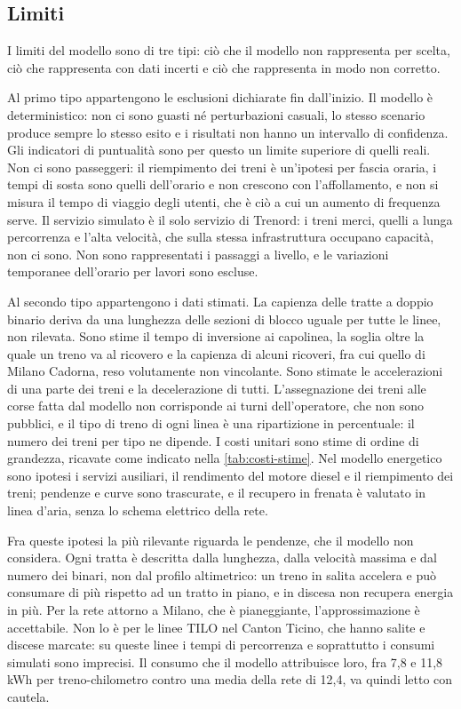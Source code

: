 \subsection{Limiti}
I limiti del modello sono di tre tipi: ciò che il modello non rappresenta per scelta, ciò che rappresenta con dati incerti e ciò che rappresenta in modo non corretto.

Al primo tipo appartengono le esclusioni dichiarate fin dall'inizio. Il modello è deterministico: non ci sono guasti né perturbazioni casuali, lo stesso scenario produce sempre lo stesso esito e i risultati non hanno un intervallo di confidenza. Gli indicatori di puntualità sono per questo un limite superiore di quelli reali. Non ci sono passeggeri: il riempimento dei treni è un'ipotesi per fascia oraria, i tempi di sosta sono quelli dell'orario e non crescono con l'affollamento, e non si misura il tempo di viaggio degli utenti, che è ciò a cui un aumento di frequenza serve. Il servizio simulato è il solo servizio di Trenord: i treni merci, quelli a lunga percorrenza e l'alta velocità, che sulla stessa infrastruttura occupano capacità, non ci sono. Non sono rappresentati i passaggi a livello, e le variazioni temporanee dell'orario per lavori sono escluse.

Al secondo tipo appartengono i dati stimati. La capienza delle tratte a doppio binario deriva da una lunghezza delle sezioni di blocco uguale per tutte le linee, non rilevata. Sono stime il tempo di inversione ai capolinea, la soglia oltre la quale un treno va al ricovero e la capienza di alcuni ricoveri, fra cui quello di Milano Cadorna, reso volutamente non vincolante. Sono stimate le accelerazioni di una parte dei treni e la decelerazione di tutti. L'assegnazione dei treni alle corse fatta dal modello non corrisponde ai turni dell'operatore, che non sono pubblici, e il tipo di treno di ogni linea è una ripartizione in percentuale: il numero dei treni per tipo ne dipende. I costi unitari sono stime di ordine di grandezza, ricavate come indicato nella \cref{tab:costi-stime}. Nel modello energetico sono ipotesi i servizi ausiliari, il rendimento del motore diesel e il riempimento dei treni; pendenze e curve sono trascurate, e il recupero in frenata è valutato in linea d'aria, senza lo schema elettrico della rete.

Fra queste ipotesi la più rilevante riguarda le pendenze, che il modello non considera. Ogni tratta è descritta dalla lunghezza, dalla velocità massima e dal numero dei binari, non dal profilo altimetrico: un treno in salita accelera e può consumare di più rispetto ad un tratto in piano, e in discesa non recupera energia in più. Per la rete attorno a Milano, che è pianeggiante, l'approssimazione è accettabile. Non lo è per le linee TILO nel Canton Ticino, che hanno salite e discese marcate: su queste linee i tempi di percorrenza e soprattutto i consumi simulati sono imprecisi. Il consumo che il modello attribuisce loro, fra 7,8 e 11,8 kWh per treno-chilometro contro una media della rete di 12,4, va quindi letto con cautela.

